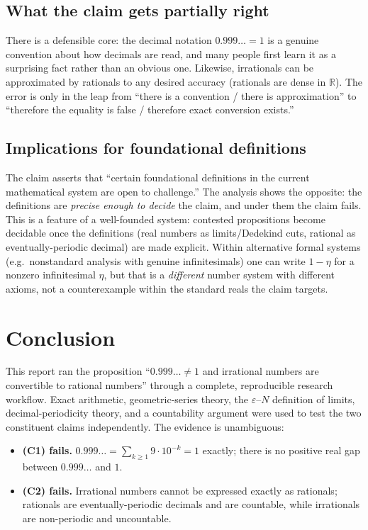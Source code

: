 \documentclass[11pt,a4paper]{article}
\begin{document}
\subsection{What the claim gets partially right}
There is a defensible core: the decimal notation $0.999\ldots=1$ is a genuine
convention about how decimals are read, and many people first learn it as a
surprising fact rather than an obvious one. Likewise, irrationals can be
approximated by rationals to any desired accuracy (rationals are dense in
$\mathbb R$). The error is only in the leap from ``there is a convention / there
is approximation'' to ``therefore the equality is false / therefore exact
conversion exists.''

\subsection{Implications for foundational definitions}
The claim asserts that ``certain foundational definitions in the current
mathematical system are open to challenge.'' The analysis shows the opposite:
the definitions are \emph{precise enough to decide} the claim, and under them the
claim fails. This is a feature of a well-founded system: contested propositions
become decidable once the definitions (real numbers as limits/Dedekind cuts,
rational as eventually-periodic decimal) are made explicit. Within alternative
formal systems (e.g.\ nonstandard analysis with genuine infinitesimals) one can
write $1-\eta$ for a nonzero infinitesimal $\eta$, but that is a \emph{different}
number system with different axioms, not a counterexample within the standard
reals the claim targets.

\section{Conclusion}
\label{sec:conclusion}

This report ran the proposition ``$0.999\ldots\neq1$ and irrational numbers are
convertible to rational numbers'' through a complete, reproducible research
workflow. Exact arithmetic, geometric-series theory, the $\varepsilon$--$N$
definition of limits, decimal-periodicity theory, and a countability argument
were used to test the two constituent claims independently. The evidence is
unambiguous:

\begin{itemize}
  \item \textbf{(C1) fails.} $0.999\ldots = \sum_{k\ge1}9\cdot10^{-k}=1$ exactly;
        there is no positive real gap between $0.999\ldots$ and $1$.
  \item \textbf{(C2) fails.} Irrational numbers cannot be expressed exactly as
        rationals; rationals are eventually-periodic decimals and are countable,
        while irrationals are non-periodic and uncountable.
\end{itemize}
\end{document}
